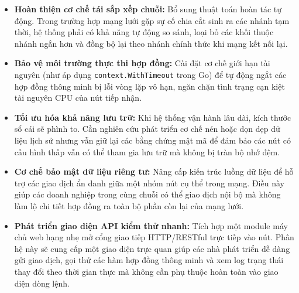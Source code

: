 \documentclass[12pt,a4paper]{article}
\begin{document}
\begin{itemize}
    \item \textbf{Hoàn thiện cơ chế tái sắp xếp chuỗi:} Bổ sung thuật toán hoàn tác tự động. Trong trường hợp mạng lưới gặp sự cố chia cắt sinh ra các nhánh tạm thời, hệ thống phải có khả năng tự động so sánh, loại bỏ các khối thuộc nhánh ngắn hơn và đồng bộ lại theo nhánh chính thức khi mạng kết nối lại.
    \item \textbf{Bảo vệ môi trường thực thi hợp đồng:} Cài đặt cơ chế giới hạn tài nguyên (như áp dụng \texttt{context.WithTimeout} trong Go) để tự động ngắt các hợp đồng thông minh bị lỗi vòng lặp vô hạn, ngăn chặn tình trạng cạn kiệt tài nguyên CPU của nút tiếp nhận.
    \item \textbf{Tối ưu hóa khả năng lưu trữ:} Khi hệ thống vận hành lâu dài, kích thước sổ cái sẽ phình to. Cần nghiên cứu phát triển cơ chế nén hoặc dọn dẹp dữ liệu lịch sử nhưng vẫn giữ lại các bằng chứng mật mã để đảm bảo các nút có cấu hình thấp vẫn có thể tham gia lưu trữ mà không bị tràn bộ nhớ đệm.
    \item \textbf{Cơ chế bảo mật dữ liệu riêng tư:} Nâng cấp kiến trúc luồng dữ liệu để hỗ trợ các giao dịch ẩn danh giữa một nhóm nút cụ thể trong mạng. Điều này giúp các doanh nghiệp trong cùng chuỗi có thể giao dịch nội bộ mà không làm lộ chi tiết hợp đồng ra toàn bộ phần còn lại của mạng lưới.
    \item \textbf{Phát triển giao diện API kiểm thử nhanh:} Tích hợp một module máy chủ web hạng nhẹ mở cổng giao tiếp HTTP/RESTful trực tiếp vào nút. Phân hệ này sẽ cung cấp một giao diện trực quan giúp các nhà phát triển dễ dàng gửi giao dịch, gọi thử các hàm hợp đồng thông minh và xem log trạng thái thay đổi theo thời gian thực mà không cần phụ thuộc hoàn toàn vào giao diện dòng lệnh.
\end{itemize}

\newpage
\end{document}
